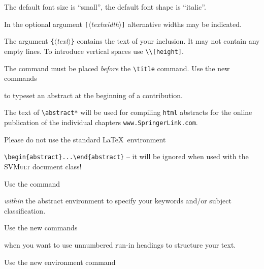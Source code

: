 \documentclass[graybox]{svmult}
\begin{document}
\begin{refguide}
\begin{sloppy}
The default font size is ``small'', the default font shape is ``italic''.


In the optional argument \verb|[|$\langle$\textit{textwidth}$\rangle$\verb|]| alternative widths may be indicated.


The argument \verb|{|$\langle$\textit{text}$\rangle$\verb|}| contains the text of your inclusion. It may not contain
any empty lines. To introduce vertical spaces use \verb|\\[height]|.


The command must be placed \textit{before} the \verb|\title| command. Use the new commands

\cprotect{}


to typeset an abstract at the beginning of a contribution.

The text of \verb|\abstract*| will be used for compiling \verb|html| abstracts for the online publication of the
individual chapters \verb|www.SpringerLink.com|.

Please do not use the standard \LaTeX\ environment 

\verb|\begin{abstract}...\end{abstract}| -- it will be ignored when used with the
\textsc{SVMult} document class!

Use the command

\cprotect{}

\textit{within} the abstract environment to specify your keywords and/or subject classification.

Use the new commands

\cprotect{}

when you want to use unnumbered run-in headings to structure your text.

Use the new environment command

\cprotect{}


\end{sloppy}
\end{refguide}
\end{document}
